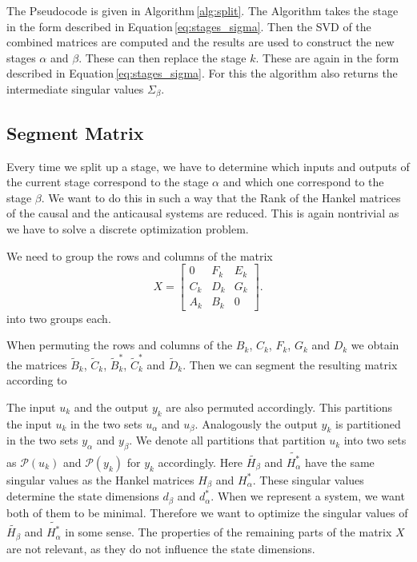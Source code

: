 \documentclass[doctype=mastersthesis,BCOR=15mm,biblatex]{ldvbook}%
\newcommand{\partition}{\mathcal{P}}
\begin{document}
The Pseudocode is given in Algorithm\,\ref{alg:split}.
The Algorithm takes the stage in the form described in Equation\,\ref{eq:stages_sigma}.
Then the SVD of the combined matrices are computed and the results are used to construct the new stages $\alpha$ and $\beta$.
These can then replace the stage $k$.
These are again in the form described in Equation\,\ref{eq:stages_sigma}.
For this the algorithm also returns the intermediate singular values $\Sigma_\beta$.




\subsection{Segment Matrix}\label{subsec:segment_matrix}
Every time we split up a stage, we have to determine which inputs and outputs of the current stage correspond to the stage $\alpha$ and which one correspond to the stage $\beta$.
We want to do this in such a way that the Rank of the Hankel matrices of the causal and the anticausal systems are reduced.
This is again nontrivial as we have to solve a discrete optimization problem. 

We need to group the rows and columns of the matrix
\begin{equation}
X=
\begin{bmatrix}
0   &F_k & E_k\\
C_k & D_k & G_k\\
A_k & B_k & 0
\end{bmatrix}
.
\end{equation}
into two groups each.

When permuting the rows and columns of the $B_k$, $C_k$, $F_k$, $G_k$ and $D_k$ we obtain the matrices $\tilde{B}_k$, $\tilde{C}_k$, $\tilde{B}_k^*$, $\tilde{C}_k^*$ and $\tilde{D}_k$.
Then we can segment the resulting matrix according to 



The input $u_k$ and the output $y_k$ are also permuted accordingly.
This partitions the input $u_k$ in the two sets $u_\alpha$ and $u_\beta$.
Analogously the output $y_k$ is partitioned in the two sets $y_\alpha$ and $y_\beta$.
We denote all partitions that partition $u_k$ into two sets as $\partition(u_k)$
and $\partition(y_k)$ for $y_k$ accordingly.
Here $\tilde{H_\beta}$ and $\tilde{H_\alpha^*}$ have the same singular values as the Hankel matrices $H_\beta$ and $H_\alpha^*$.
These singular values determine the state dimensions $d_\beta$ and $d_\alpha^*$.
When we represent a system, we want both of them to be minimal.
Therefore we want to optimize the singular values of $\tilde{H_\beta}$ and $\tilde{H_\alpha^*}$ in some sense. 
The properties of the remaining parts of the matrix $X$ are not relevant, as they do not influence the state dimensions.
\end{document}
